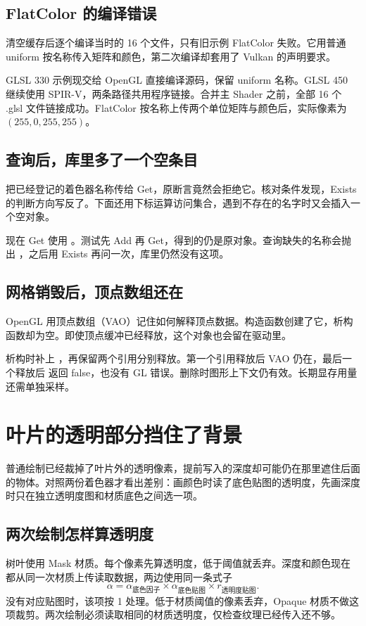\subsection{FlatColor 的编译错误}
清空缓存后逐个编译当时的 16 个文件，只有旧示例 FlatColor 失败。它用普通 uniform 按名称传入矩阵和颜色，第二次编译却套用了 Vulkan 的声明要求。

GLSL 330 示例现交给 OpenGL 直接编译源码，保留 uniform 名称。GLSL 450 继续使用 SPIR-V，两条路径共用程序链接。合并主 Shader 之前，全部 16 个 .glsl 文件链接成功。FlatColor 按名称上传两个单位矩阵与颜色后，实际像素为 $(255,0,255,255)$。

\subsection{查询后，库里多了一个空条目}
把已经登记的着色器名称传给 Get，原断言竟然会拒绝它。核对条件发现，Exists 的判断方向写反了。下面还用下标运算访问集合，遇到不存在的名字时又会插入一个空对象。

现在 Get 使用 。测试先 Add 再 Get，得到的仍是原对象。查询缺失的名称会抛出 ，之后用 Exists 再问一次，库里仍然没有这项。

\subsection{网格销毁后，顶点数组还在}
OpenGL 用顶点数组（VAO）记住如何解释顶点数据。构造函数创建了它，析构函数却为空。即使顶点缓冲已经释放，这个对象也会留在驱动里。

析构时补上 ，再保留两个引用分别释放。第一个引用释放后 VAO 仍在，最后一个释放后  返回 false，也没有 GL 错误。删除时图形上下文仍有效。长期显存用量还需单独采样。

\newpage
\section{叶片的透明部分挡住了背景}
普通绘制已经裁掉了叶片外的透明像素，提前写入的深度却可能仍在那里遮住后面的物体。对照两份着色器才看出差别：画颜色时读了底色贴图的透明度，先画深度时只在独立透明度图和材质底色之间选一项。

\subsection{两次绘制怎样算透明度}
树叶使用 Mask 材质。每个像素先算透明度，低于阈值就丢弃。深度和颜色现在都从同一次材质上传读取数据，两边使用同一条式子
\[
\alpha=\alpha_{\text{底色因子}}
       \times\alpha_{\text{底色贴图}}
       \times r_{\text{透明度贴图}}.
\]
没有对应贴图时，该项按 1 处理。低于材质阈值的像素丢弃，Opaque 材质不做这项裁剪。两次绘制必须读取相同的材质透明度，仅检查纹理已经传入还不够。

